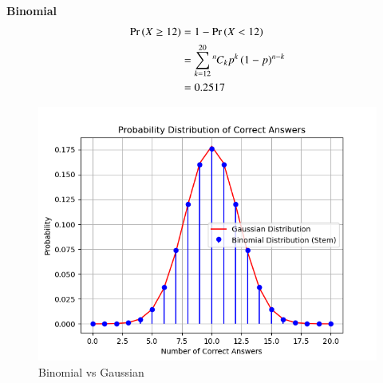 \documentclass[journal,12pt,twocolumn]{IEEEtran}
\theoremstyle{remark}
\begin{document}
\textbf{Binomial}
\begin{align}
\Pr\left(X\ge12\right) &= 1 - \Pr\left(X<12\right) \\
&= \sum_{k=12}^{20}{{}^{n}\mkern-1muC_{k}}p^k\left(1-p\right)^{n-k} \\
&= 0.2517
\end{align}
\begin{figure}[!ht]
\centering
\includegraphics[width=\columnwidth]{./figs/dist.png}
\caption{Binomial vs Gaussian}
\label{fig:BvG_py}
\end{figure}
\end{document}
